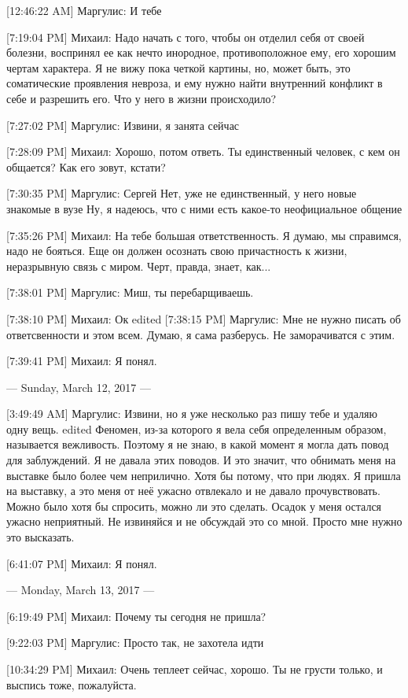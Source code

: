 \documentclass{article}
\begin{document}
[12:46:22 AM] Маргулис:
И тебе

[7:19:04 PM] Михаил:
Надо начать с того, чтобы он отделил себя от своей болезни, воспринял ее как нечто инородное, противоположное ему, его хорошим чертам характера. Я не вижу пока четкой картины, но, может быть, это соматические проявления невроза, и ему нужно найти внутренний конфликт в себе и разрешить его. Что у него в жизни происходило?

[7:27:02 PM] Маргулис:
Извини, я занята сейчас

[7:28:09 PM] Михаил:
Хорошо, потом ответь.
 Ты единственный человек, с кем он общается? Как его зовут, кстати?

[7:30:35 PM] Маргулис:
Сергей
 Нет, уже не единственный, у него новые знакомые в вузе
 Ну, я надеюсь, что с ними есть какое-то неофициальное общение

[7:35:26 PM] Михаил:
На тебе большая ответственность. Я думаю, мы справимся, надо не бояться. Еще он должен осознать свою причастность к жизни, неразрывную связь с миром. Черт, правда, знает, как...

[7:38:01 PM] Маргулис:
Миш, ты перебарщиваешь.

[7:38:10 PM] Михаил:
Ок
edited 
[7:38:15 PM] Маргулис:
Мне не нужно писать об ответсвенности и этом всем.
 Думаю, я сама разберусь. Не заморачиватся с этим.

[7:39:41 PM] Михаил:
Я понял.

--- Sunday, March 12, 2017 ---

[3:49:49 AM] Маргулис:
Извини, но я уже несколько раз пишу тебе и удаляю одну вещь.
edited 
Феномен, из-за которого я вела себя определенным образом, называется вежливость.
 Поэтому я не знаю, в какой момент я могла дать повод для заблуждений. Я не давала этих поводов.
 И это значит, что обнимать меня на выставке было более чем неприлично. Хотя бы потому, что при людях.
 Я пришла на выставку, а это меня от неё ужасно отвлекало и не давало прочувствовать. Можно было хотя бы спросить, можно ли это сделать.
 Осадок у меня остался ужасно неприятный. Не извиняйся и не обсуждай это со мной. Просто мне нужно это высказать.

[6:41:07 PM] Михаил:
Я понял.

--- Monday, March 13, 2017 ---

[6:19:49 PM] Михаил:
Почему ты сегодня не пришла?

[9:22:03 PM] Маргулис:
Просто так, не захотела идти

[10:34:29 PM] Михаил:
Очень теплеет сейчас, хорошо. Ты не грусти только, и выспись тоже, пожалуйста.
\end{document}
